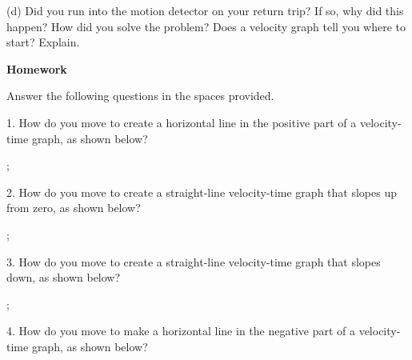 (d) Did you run into the motion detector on your return trip? If so, why did
this happen? How did you solve the problem? Does a velocity graph tell you where
to start? Explain.
\answerspace{25mm}

\pagebreak[2]
\textbf{Homework} 

Answer the following questions in the spaces provided.

1. How do you move to create a horizontal line in the positive part of a velocity-time
graph, as shown below?

\begin{lab_axis}[lab_noticks_2quads,
	height = {2.0in}, width = {2.5in},
	xlabel={Time},
	ylabel={Velocity},
	plus_minus_zero_labels,
	]
;
\end{lab_axis}
\answerspace{0.2in}

2. How do you move to create a straight-line velocity-time graph that slopes
up from zero, as shown below?

\begin{lab_axis}[lab_noticks_2quads,
	height = {2.0in}, width = {2.5in},
	xlabel={Time},
	ylabel={Velocity},
	plus_minus_zero_labels,
	]
;
\end{lab_axis}
\answerspace{0.2in}

3. How do you move to create a straight-line velocity-time graph that slopes
down, as shown below?

\begin{lab_axis}[lab_noticks_2quads,
	height = {2.0in}, width = {2.5in},
	xlabel={Time},
	ylabel={Velocity},
	plus_minus_zero_labels,
	]
;
\end{lab_axis}
\answerspace{0.2in}

4. How do you move to make a horizontal line in the negative part of a velocity-time
graph, as shown below?

